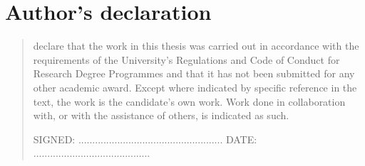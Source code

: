 %
%
%
%
%
%
\chapter*{Author's declaration}
\begin{SingleSpace}
\begin{quote}


 declare that the work in this thesis was carried out in accordance with the requirements of the University's Regulations and Code of Conduct for Research Degree Programmes and that it has not been submitted for any other academic award. Except where indicated by specific reference in the text, the work is the candidate's own work. Work done in collaboration with, or with the assistance of others, is indicated as such.

\vspace{1.5cm}
\noindent
\hspace{-0.75cm}\textsc{SIGNED: .................................................... DATE: ..........................................}
\end{quote}
\end{SingleSpace}
\clearpage